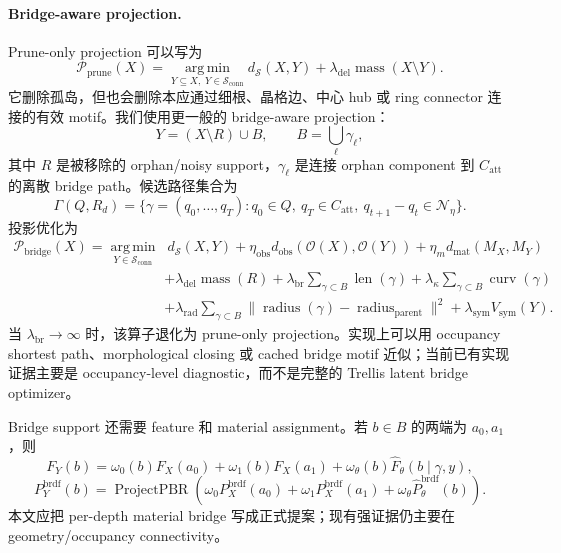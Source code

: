 \paragraph{Bridge-aware projection.}
Prune-only projection 可以写为
\begin{equation}
\mathcal{P}_{\mathrm{prune}}(X)=
\operatorname*{arg\,min}_{Y\subseteq X,\;Y\in\mathcal{S}_{\mathrm{conn}}}
d_{\mathcal{S}}(X,Y)
+\lambda_{\mathrm{del}}\operatorname{mass}(X\setminus Y).
\end{equation}
它删除孤岛，但也会删除本应通过细根、晶格边、中心 hub 或 ring connector 连接的有效 motif。我们使用更一般的 bridge-aware projection：
\begin{equation}
Y=(X\setminus R)\cup B,\qquad
B=\bigcup_\ell\gamma_\ell ,
\end{equation}
其中 \(R\) 是被移除的 orphan/noisy support，\(\gamma_\ell\) 是连接 orphan component 到 \(C_{\mathrm{att}}\) 的离散 bridge path。候选路径集合为
\begin{equation}
\Gamma(Q,R_d)=
\{\gamma=(q_0,\ldots,q_T):
q_0\in Q,\ q_T\in C_{\mathrm{att}},\
q_{t+1}-q_t\in\mathcal N_\eta\}.
\end{equation}
投影优化为
\begin{equation}
\begin{split}
\mathcal{P}_{\mathrm{bridge}}(X)=
\operatorname*{arg\,min}_{Y\in\mathcal{S}_{\mathrm{conn}}}
&\ d_{\mathcal{S}}(X,Y)
+\eta_{\mathrm{obs}}d_{\mathrm{obs}}(\mathcal O(X),\mathcal O(Y))
+\eta_m d_{\mathrm{mat}}(M_X,M_Y)\\
&+\lambda_{\mathrm{del}}\operatorname{mass}(R)
+\lambda_{\mathrm{br}}\sum_{\gamma\subset B}\operatorname{len}(\gamma)
+\lambda_{\kappa}\sum_{\gamma\subset B}\operatorname{curv}(\gamma)\\
&+\lambda_{\mathrm{rad}}\sum_{\gamma\subset B}
\|\operatorname{radius}(\gamma)-\operatorname{radius}_{\mathrm{parent}}\|^2
+\lambda_{\mathrm{sym}}V_{\mathrm{sym}}(Y).
\end{split}
\end{equation}
当 \(\lambda_{\mathrm{br}}\rightarrow\infty\) 时，该算子退化为 prune-only projection。实现上可以用 occupancy shortest path、morphological closing 或 cached bridge motif 近似；当前已有实现证据主要是 occupancy-level diagnostic，而不是完整的 Trellis latent bridge optimizer。

Bridge support 还需要 feature 和 material assignment。若 \(b\in B\) 的两端为 \(a_0,a_1\)，则
\begin{equation}
F_Y(b)=
\omega_0(b)F_X(a_0)+\omega_1(b)F_X(a_1)
+\omega_\theta(b)\widehat F_\theta(b\mid \gamma,y),
\end{equation}
\begin{equation}
P_Y^{\mathrm{brdf}}(b)=
\operatorname{ProjectPBR}\left(
\omega_0P_X^{\mathrm{brdf}}(a_0)+
\omega_1P_X^{\mathrm{brdf}}(a_1)
+\omega_\theta\widehat P_\theta^{\mathrm{brdf}}(b)\right).
\end{equation}
本文应把 per-depth material bridge 写成正式提案；现有强证据仍主要在 geometry/occupancy connectivity。


